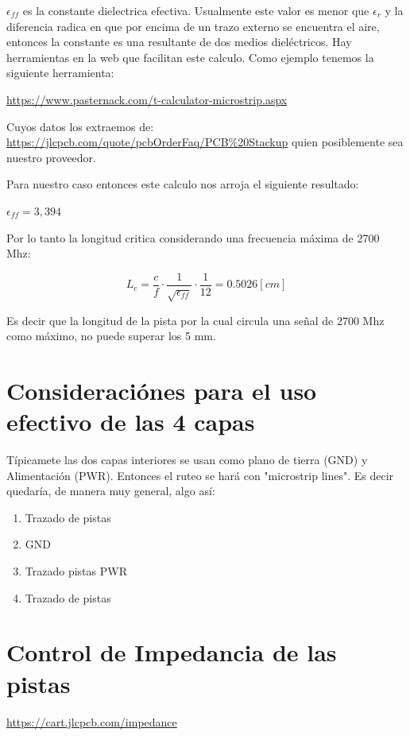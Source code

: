 \documentclass[a4paper,12pt]{report} %
\begin{document}
$\epsilon_{ff}$ es la constante dielectrica efectiva. Usualmente este valor es menor que $\epsilon_r$ y la diferencia radica en que por encima de un trazo externo se encuentra el aire, entonces la constante es una resultante de dos medios dieléctricos.
Hay herramientas en la web que facilitan este calculo. Como ejemplo tenemos la siguiente herramienta: 

\url{https://www.pasternack.com/t-calculator-microstrip.aspx}

Cuyos datos los extraemos de: \url{https://jlcpcb.com/quote/pcbOrderFaq/PCB\%20Stackup} quien posiblemente sea nuestro proveedor. 


Para nuestro caso entonces este calculo nos arroja el siguiente resultado: 

$\epsilon_{ff} = 3,394$

Por lo tanto la longitud critica considerando una frecuencia máxima de 2700 Mhz: 

\begin{equation}
L_c = \frac{c}{f} \cdot \frac{1}{\sqrt{\epsilon_{ff}}} \cdot \frac{1}{12} = 0.5026 [cm]
\end{equation}


Es decir que la longitud de la pista por la cual circula una señal de 2700 Mhz como máximo, no puede superar los 5 mm.


\section{Consideraciónes para el uso efectivo de las 4 capas}

Típicamete las dos capas interiores se usan como plano de tierra (GND) y Alimentación (PWR). Entonces el ruteo se hará con "microstrip lines". Es decir quedaría, de manera muy general, algo así: 

\begin{enumerate}
	\item Trazado de pistas
	\item GND
	\item Trazado pistas PWR
	\item Trazado de pistas
\end{enumerate}

\section{Control de Impedancia de las pistas}

\url{https://cart.jlcpcb.com/impedance}
\end{document}
